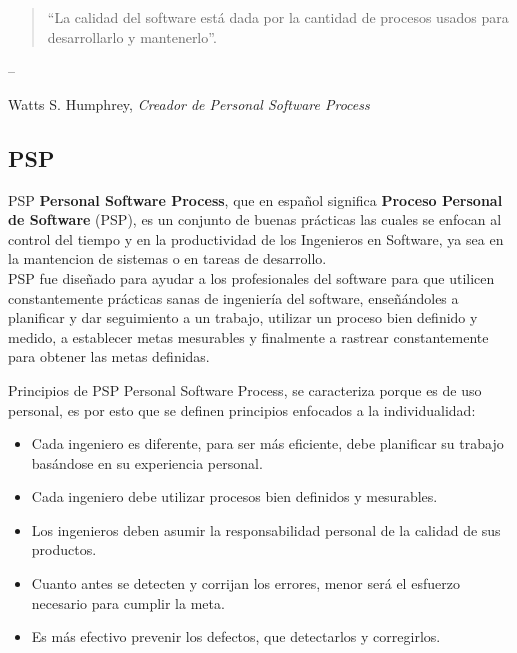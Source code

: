 \documentclass[]{beamer}
\begin{document}
				\begin{frame}
					\begin{quotation}``La calidad del software está dada por la cantidad de procesos usados para desarrollarlo y mantenerlo''.\end{quotation}
			
				\hfill -- \parbox[t]{.9\textwidth}{Watts S. Humphrey,
				\textit{Creador de Personal Software Process}}

				\end{frame}
		
		\subsection{PSP}
			\begin{frame}{PSP}
				\textbf{Personal Software Process}, que en español significa \textbf{Proceso Personal de Software} (PSP), es un conjunto de buenas pr\'acticas las cuales se enfocan al control del tiempo y en la productividad de los Ingenieros en Software, ya sea en la mantencion de sistemas o en tareas de desarrollo.
				\\ \smallskip
				PSP fue diseñado para ayudar a los profesionales del software para que utilicen constantemente prácticas sanas de ingeniería del software, enseñándoles a planificar y dar seguimiento a un trabajo, utilizar un proceso bien definido y medido, a establecer metas mesurables y finalmente a rastrear constantemente para obtener las metas definidas.
			\end{frame}
			
			\begin{frame}{Principios de PSP}
				Personal Software Process, se caracteriza porque es de uso personal, es por esto que se definen principios enfocados a la individualidad:				
				\begin{itemize}
					\smallskip
					\item Cada ingeniero es diferente, para ser más eficiente, debe planificar su trabajo basándose en su experiencia personal.\\ \pause
					\item Cada ingeniero debe utilizar procesos bien definidos y mesurables.\\ \pause
					\item Los ingenieros deben asumir la responsabilidad personal de la calidad de sus productos.\\ \pause
					\item Cuanto antes se detecten y corrijan los errores, menor será el esfuerzo necesario para cumplir la meta.\\ \pause
					\item Es más efectivo prevenir los defectos, que detectarlos y corregirlos.\\
				\end{itemize}
			\end{frame}						
			
\end{document}
